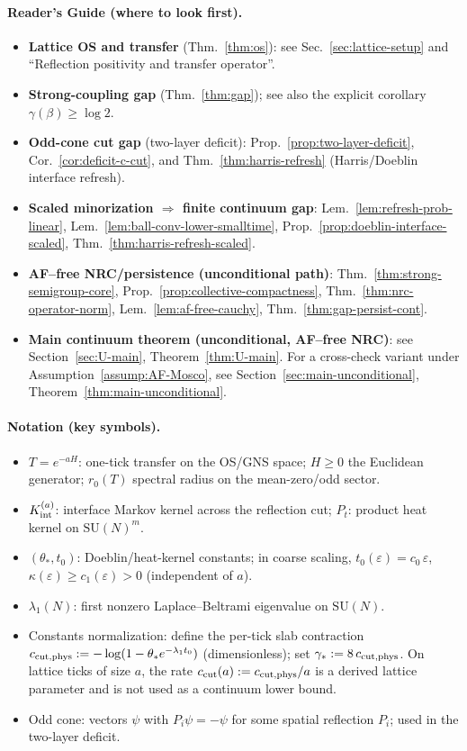 \documentclass[11pt]{amsart}
\theoremstyle{plain}
\theoremstyle{definition}
\theoremstyle{remark}
\begin{document}
\paragraph{Reader's Guide (where to look first).}
\begin{itemize}
  \item \textbf{Lattice OS and transfer} (Thm.~\ref{thm:os}): see Sec.~\ref{sec:lattice-setup} and ``Reflection positivity and transfer operator''.
  \item \textbf{Strong-coupling gap} (Thm.~\ref{thm:gap}); see also the explicit corollary $\gamma(\beta)\ge \log 2$.
  \item \textbf{Odd-cone cut gap} (two-layer deficit): Prop.~\ref{prop:two-layer-deficit}, Cor.~\ref{cor:deficit-c-cut}, and Thm.~\ref{thm:harris-refresh} (Harris/Doeblin interface refresh).
  \item \textbf{Scaled minorization $\Rightarrow$ finite continuum gap}: Lem.~\ref{lem:refresh-prob-linear}, Lem.~\ref{lem:ball-conv-lower-smalltime}, Prop.~\ref{prop:doeblin-interface-scaled}, Thm.~\ref{thm:harris-refresh-scaled}.
  \item \textbf{AF–free NRC/persistence (unconditional path)}: Thm.~\ref{thm:strong-semigroup-core}, Prop.~\ref{prop:collective-compactness}, Thm.~\ref{thm:nrc-operator-norm}, Lem.~\ref{lem:af-free-cauchy}, Thm.~\ref{thm:gap-persist-cont}.
  \item \textbf{Main continuum theorem (unconditional, AF--free NRC)}: see Section~\ref{sec:U-main}, Theorem~\ref{thm:U-main}. For a cross-check variant under Assumption~\ref{assump:AF-Mosco}, see Section~\ref{sec:main-unconditional}, Theorem~\ref{thm:main-unconditional}.
\end{itemize}

\paragraph{Notation (key symbols).}
\begin{itemize}
  \item $T=e^{-aH}$: one-tick transfer on the OS/GNS space; $H\ge 0$ the Euclidean generator; $r_0(T)$ spectral radius on the mean-zero/odd sector.
  \item $K_{\rm int}^{(a)}$: interface Markov kernel across the reflection cut; $P_t$: product heat kernel on $\mathrm{SU}(N)^m$.
  \item $(\theta_*,t_0)$: Doeblin/heat-kernel constants; in coarse scaling, $t_0(\varepsilon)=c_0\,\varepsilon$, $\kappa(\varepsilon)\ge c_1(\varepsilon)>0$ (independent of $a$).
  \item $\lambda_1(N)$: first nonzero Laplace--Beltrami eigenvalue on $\mathrm{SU}(N)$.
  \item Constants normalization: define the per-tick slab contraction $c_{\rm cut,phys}:= -\log(1-\theta_* e^{-\lambda_1 t_0})$ (dimensionless); set $\gamma_*:=8\,c_{\rm cut,phys}$. On lattice ticks of size $a$, the rate $c_{\rm cut}(a):=c_{\rm cut,phys}/a$ is a derived lattice parameter and is not used as a continuum lower bound.
  \item Odd cone: vectors $\psi$ with $P_i\psi=-\psi$ for some spatial reflection $P_i$; used in the two-layer deficit.
\end{itemize}
\end{document}

